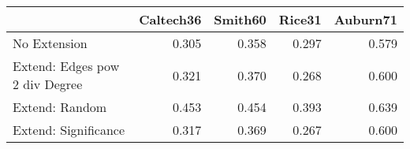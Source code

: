 \begin{tabular}{lrrrr}
\toprule
{} & Caltech36 & Smith60 & Rice31 & Auburn71 \\
\midrule
No Extension                   &     0.305 &   0.358 &  0.297 &    0.579 \\
Extend: Edges pow 2 div Degree &     0.321 &   0.370 &  0.268 &    0.600 \\
Extend: Random                 &     0.453 &   0.454 &  0.393 &    0.639 \\
Extend: Significance           &     0.317 &   0.369 &  0.267 &    0.600 \\
\bottomrule
\end{tabular}
